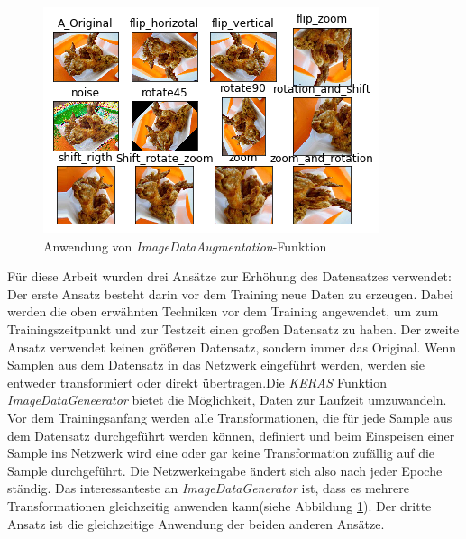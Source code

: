 \documentclass[12pt,a4paper]{scrartcl}
\numberwithin{equation}{section}
\begin{document}
\begin{figure}[h!]
	\centering
	\includegraphics[width=\textwidth]{ImageDataAugmaentation.png}
	\caption{Anwendung von \textit{ImageDataAugmentation}-Funktion }
	\label{fig:ImageDataAugmentation}
\end{figure}

Für diese Arbeit wurden drei Ansätze zur Erhöhung des Datensatzes verwendet:
Der erste Ansatz besteht darin vor dem Training neue Daten zu erzeugen. Dabei werden die oben erwähnten Techniken vor dem Training angewendet, um zum Trainingszeitpunkt und zur Testzeit einen großen Datensatz zu haben. Der zweite Ansatz verwendet keinen größeren Datensatz, sondern immer das Original. Wenn Samplen aus dem Datensatz in das Netzwerk eingeführt werden, werden sie entweder transformiert oder direkt übertragen.Die \textit{KERAS} Funktion \textit{ImageDataGeneerator} bietet die Möglichkeit, Daten zur Laufzeit umzuwandeln. Vor dem Trainingsanfang werden alle Transformationen, die für jede Sample aus dem Datensatz durchgeführt werden können, definiert und beim Einspeisen einer Sample ins Netzwerk wird eine oder gar keine Transformation zufällig auf die Sample durchgeführt. Die Netzwerkeingabe ändert sich also nach jeder Epoche ständig. Das interessanteste an \textit{ImageDataGenerator} ist, dass es mehrere Transformationen gleichzeitig anwenden kann(siehe Abbildung \ref{fig:ImageDataAugmentation}). Der dritte Ansatz ist die gleichzeitige Anwendung der beiden anderen Ansätze.
\end{document}
